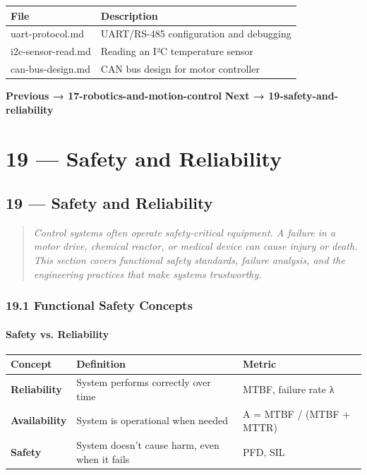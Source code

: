 \documentclass[11pt,a4paper]{book}
\begin{document}
\begin{itemize}
\begin{center}
\begin{tabular}{|l|l|}
\hline
File & Description \\
\hline
uart-protocol.md & UART/RS-485 configuration and debugging \\
i2c-sensor-read.md & Reading an I²C temperature sensor \\
can-bus-design.md & CAN bus design for motor controller \\
\hline
\end{tabular}
\end{center}

\medskip\noindent\hrulefill\medskip

\textbf{Previous → 17-robotics-and-motion-control}  
\textbf{Next → 19-safety-and-reliability}


\chapter{19 — Safety and Reliability}
\section{19 — Safety and Reliability}

\begin{quote}
\textit{Control systems often operate safety-critical equipment. A failure in a motor drive, chemical reactor, or medical device can cause injury or death. This section covers functional safety standards, failure analysis, and the engineering practices that make systems trustworthy.}
\end{quote}

\medskip\noindent\hrulefill\medskip

\subsection{19.1 Functional Safety Concepts}

\subsubsection{Safety vs. Reliability}

\begin{center}
\begin{tabular}{|l|l|l|}
\hline
Concept & Definition & Metric \\
\hline
\textbf{Reliability} & System performs correctly over time & MTBF, failure rate λ \\
\textbf{Availability} & System is operational when needed & A = MTBF / (MTBF + MTTR) \\
\textbf{Safety} & System doesn't cause harm, even when it fails & PFD, SIL \\
\hline
\end{tabular}
\end{center}


\end{itemize}
\end{document}
